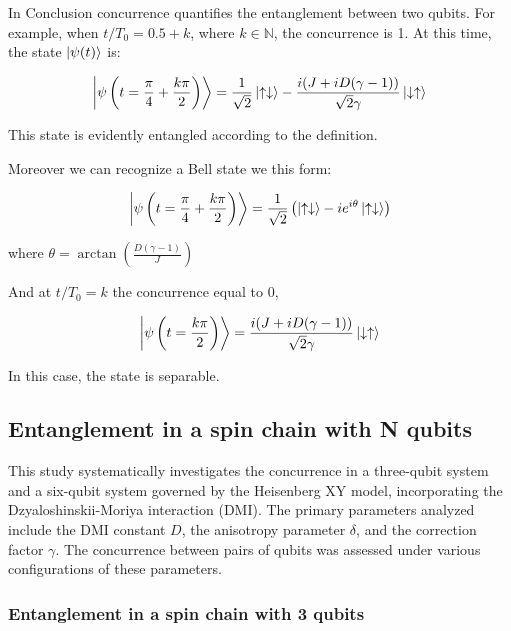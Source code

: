 In Conclusion
 concurrence 
 quantifies the entanglement between two qubits. 
 For example, when \(t/T_0 = 0.5 + k\), where \(k \in \mathbb{N}\), the concurrence is 1. At this time, the state \(\ket{\psi (t)}\) is:


 
 \begin{equation*}
 	\ket{\psi \left( t = \frac{\pi}{4} + \frac{k\pi}{2}\right) } = \frac{1}{\sqrt{2}} \ket{\uparrow \downarrow} - \frac{i(J + iD(\gamma -1))}{\sqrt{2}\gamma}   \ket{\downarrow \uparrow}
 \end{equation*}
 
 
This state is evidently entangled according to the definition.

Moreover we can recognize a Bell state we this form: 

\begin{equation}
		\ket{\psi \left( t = \frac{\pi}{4} + \frac{k\pi}{2}\right) } = \frac{1}{\sqrt{2}} \left(  \ket{\uparrow \downarrow} -ie^{i\theta}\ket{\uparrow \downarrow}  \right)
\end{equation}

where $ \theta = \arctan\left( \frac{D(\gamma -1)}{J}\right)$


 
And at $t/T_0 = k$ the concurrence equal to $0$, 

 \begin{equation*}
	\ket{\psi \left( t = \frac{k\pi}{2}\right) } = \frac{i(J + iD(\gamma -1))}{\sqrt{2}\gamma}   \ket{\downarrow \uparrow}
\end{equation*}

In this case, the state is separable.
	

\newpage
\subsection{Entanglement in a spin chain with N qubits}
This study systematically investigates the concurrence in a three-qubit system and a six-qubit system
governed by the Heisenberg XY model, incorporating the Dzyaloshinskii-Moriya interaction (DMI). 
The primary parameters analyzed include the DMI constant \(D\), the anisotropy parameter \(\delta\), and the correction factor 
\(\gamma\). The concurrence between pairs of qubits was assessed under various configurations of these parameters.


\subsubsection{Entanglement in a spin chain with 3 qubits}



